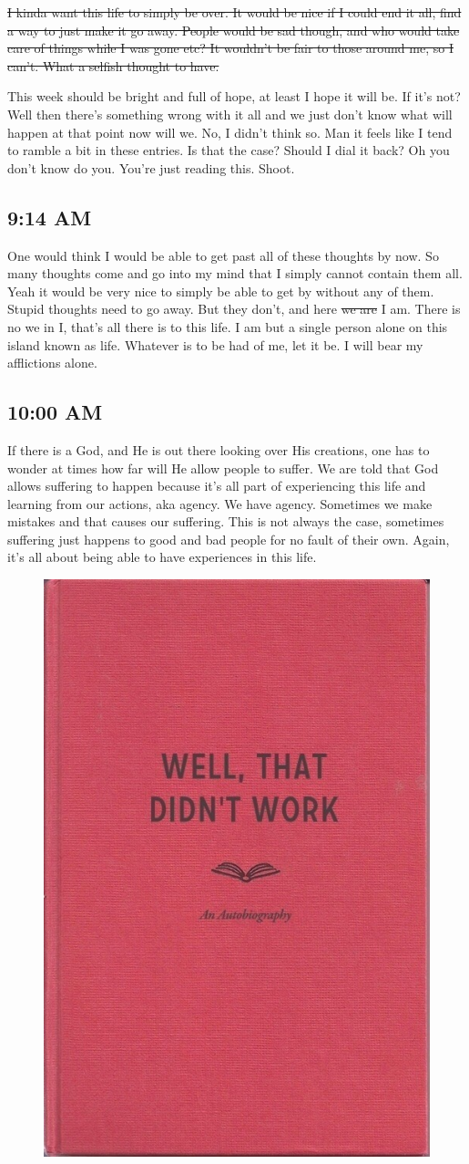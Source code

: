 \st{I kinda want this life to simply be over. It would be nice if I could end it all,
find a way to just make it go away. People would be sad though, and who would take
care of things while I was gone etc? It wouldn't be fair to those around me, so I 
can't. What a selfish thought to have.}

This week should be bright and full of hope, at least I hope it will be. If it's not?
Well then there's something wrong with it all and we just don't know what will happen
at that point now will we. No, I didn't think so. Man it feels like I tend to ramble
a bit in these entries. Is that the case? Should I dial it back? Oh you don't know do
you. You're just reading this. Shoot.

\subsection{9:14 AM}

One would think I would be able to get past all of these thoughts by now. So many
thoughts come and go into my mind that I simply cannot contain them all. Yeah it
would be very nice to simply be able to get by without any of them. Stupid thoughts
need to go away. But they don't, and here \st{we are} I am. There is no we in I,
that's all there is to this life. I am but a single person alone on this island known
as life. Whatever is to be had of me, let it be. I will bear my afflictions alone.

\subsection{10:00 AM}

If there is a God, and He is out there looking over His creations, one has to wonder
at times how far will He allow people to suffer. We are told that God allows
suffering to happen because it's all part of experiencing this life and learning from
our actions, aka agency. We have agency. Sometimes we make mistakes and that causes
our suffering. This is not always the case, sometimes suffering just happens to good
and bad people for no fault of their own. Again, it's all about being able to have
experiences in this life.

\begin{figure}
  \includegraphics[width=.2\textwidth]{2018/images/work.jpg}
  \label{fig:work}
\end{figure}

